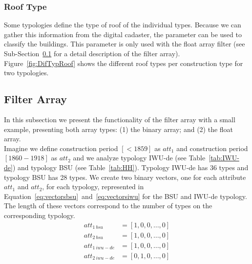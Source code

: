 


\subsubsection{Roof Type}

Some typologies define the type of roof of the individual types.
Because we can gather this information from the digital cadaster, the parameter
can be used to classify the buildings.  This parameter is only used with the
float array filter (see Sub-Section~\ref{sub-sec:filter} for a detail
description of the filter array). Figure~\ref{fig:DifTypRoof} shows the
different roof types per construction type for two typologies.\\


 
\subsection{Filter Array}\label{sub-sec:filter}

In this subsection we present the functionality of the filter array with a
small example, presenting both array types: (1) the binary array; and (2) the
float array.\\

Imagine we define construction period $[<1859]$ as $att_1$ and construction
period $[1860 - 1918]$ as $att_2$ and we analyze typology IWU-de (see
Table~\ref{tab:IWU-de}) and typology BSU (see Table~\ref{tab:HH}).  Typology
IWU-de has 36 types and typology BSU has 28 types. 
We create two binary vectors, one for each attribute $att_1$ and $att_2$, for
each typology, represented in
Equation~\ref{eq:vectorsbsu}~and~\ref{eq:vectorsiwu} for the BSU and IWU-de
typology. The length of these vectors correspond to the number of types on the
corresponding typology.\\

\begin{align} \label{eq:vectorsbsu}
att_{1~bsu}    &= [1, 0, 0, \dots, 0] \nonumber \\
att_{2~bsu}    &= [1, 0, 0, \dots, 0] \\ \label{eq:vectorsiwu}
att_{1~iwu-de} &= [1, 0, 0, \dots, 0] \nonumber \\
att_{2~iwu-de} &= [0, 1, 0, \dots, 0]
\end{align}

